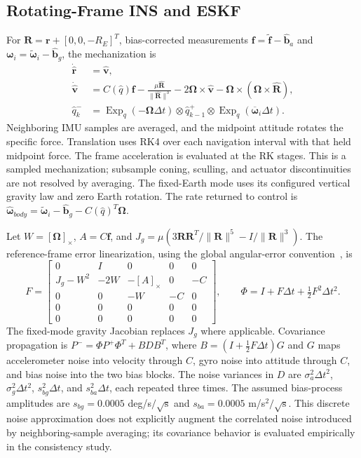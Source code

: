 \subsection{Rotating-Frame INS and ESKF}\label{sec:nav-filter}
For $\bm R=\bm r+[0,0,-R_E]^T$, bias-corrected measurements
$\bm f=\widetilde{\bm f}-\widehat{\bm b}_a$ and
$\bm\omega_i=\widetilde{\bm\omega}_i-\widehat{\bm b}_g$, the mechanization is
\begin{align}
 \dot{\widehat{\bm r}}&=\widehat{\bm v},\\
 \dot{\widehat{\bm v}}&=C(\widehat q)\bm f
   -\frac{\mu\widehat{\bm R}}{\|\widehat{\bm R}\|^3}
   -2\bm\Omega\times\widehat{\bm v}
   -\bm\Omega\times(\bm\Omega\times\widehat{\bm R}),\\
 \widehat q_k^-&=\operatorname{Exp}_q(-\bm\Omega\Delta t)\otimes
   \widehat q_{k-1}^+\otimes\operatorname{Exp}_q(\overline{\bm\omega}_i\Delta t).
\end{align}
Neighboring IMU samples are averaged, and the midpoint attitude rotates the specific
force. Translation uses RK4 over each navigation interval with that held midpoint force.
The frame acceleration is evaluated at the RK stages. This is a sampled mechanization;
subsample coning, sculling, and actuator discontinuities are not resolved by averaging.
The fixed-Earth mode uses its configured vertical gravity law and zero Earth rotation.
The rate returned to control is
$\widehat{\bm\omega}_{body}=\widetilde{\bm\omega}_i-\widehat{\bm b}_g
-C(\widehat q)^T\bm\Omega$.

Let $W=[\bm\Omega]_\times$, $A=C\bm f$, and
$J_g=\mu(3\bm R\bm R^T/\|\bm R\|^5-I/\|\bm R\|^3)$. The reference-frame
error linearization, using the global angular-error convention~\cite{sola}, is
\begin{equation}
 F=\begin{bmatrix}
 0&I&0&0&0\\
 J_g-W^2&-2W&-[A]_\times&0&-C\\
 0&0&-W&-C&0\\
 0&0&0&0&0\\
 0&0&0&0&0
 \end{bmatrix},\qquad
 \Phi=I+F\Delta t+\tfrac12F^2\Delta t^2.
\end{equation}
The fixed-mode gravity Jacobian replaces $J_g$ where applicable. Covariance propagation is
$P^- =\Phi P^+\Phi^T+BDB^T$, where $B=(I+\tfrac12F\Delta t)G$ and $G$ maps
accelerometer noise into velocity through $C$, gyro noise into attitude through $C$, and
bias noise into the two bias blocks. The noise variances in $D$ are
$\sigma_a^2\Delta t^2$, $\sigma_g^2\Delta t^2$, $s_{bg}^2\Delta t$, and
$s_{ba}^2\Delta t$, each repeated three times. The assumed bias-process amplitudes are
$s_{bg}=0.0005$ deg/s$/\sqrt{\mathrm{s}}$ and
$s_{ba}=0.0005$ m/s$^2/\sqrt{\mathrm{s}}$. This discrete noise approximation does not
explicitly augment the correlated noise introduced by neighboring-sample averaging;
its covariance behavior is evaluated empirically in the consistency study.

